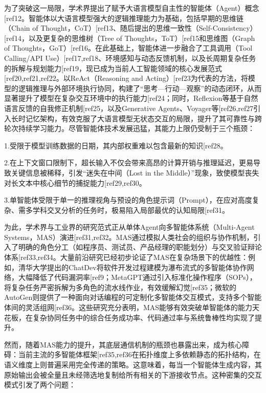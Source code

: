 \documentclass[11pt, a4paper]{article}
\makeatletter
\let\oldcite\cite
\renewcommand{\cite}{\@ifnextchar[{\cite@with}{\cite@without}}
\newcommand{\cite@with}[2][]{\textsuperscript{\oldcite[#1]{#2}}}
\newcommand{\cite@without}[1]{\textsuperscript{\oldcite{#1}}}
\numberwithin{figure}{section}
\makeatother
\begin{document}
为了突破这一局限，学术界提出了赋予大语言模型自主性的智能体（Agent）概念\cite{ref12}。智能体以大语言模型强大的逻辑推理能力为基础，包括早期的思维链（Chain of Thought，CoT）\cite{ref13}、随后提出的思维一致性（Self-Consistency）\cite{ref14}，以及更复杂的思维树（Tree of Thoughts，ToT）\cite{ref15}和思维图（Graph of Thoughts，GoT）\cite{ref16}。在此基础上，智能体进一步融合了工具调用（Tool Calling/API Use）\cite{ref17,ref18}、环境感知与动态反馈机制，以及长周期复杂任务的拆解与规划能力\cite{ref19}，现已成为当前人工智能领域的核心发展范式\cite{ref20,ref21,ref22}。以ReAct（Reasoning and Acting）\cite{ref23}为代表的方法，将模型的逻辑推理与外部环境执行协同，构建了“思考—行动—观察”的动态闭环，从而显著提升了模型在复杂交互环境中的执行能力\cite{ref24}；同时，Reflexion等基于自然语言反馈的自我修正机制\cite{ref25}，以及Generative Agents、Voyager等\cite{ref26,ref27}引入长时记忆架构，有效克服了大语言模型无状态交互的局限，提升了其可靠性与跨轮次持续学习能力。尽管智能体技术发展迅猛，其能力上限仍受制于三个瓶颈：


\par 1.受限于模型训练数据的日期，其内部权重难以包含最新的知识\cite{ref28}。

\par 2.在上下文窗口限制下，超长输入不仅会带来高昂的计算开销与推理延迟，更易导致关键信息被稀释，引发“迷失在中间（Lost in the Middle）”现象，致使模型丧失对长文本中核心细节的捕捉能力\cite{ref29,ref30}。

\par 3.单智能体受限于单一的推理视角与预设的角色提示词（Prompt），在应对高度复杂、需多学科交叉分析的任务时，极易陷入局部最优的认知局限\cite{ref31}。

为此，学术界与工业界的研究范式正从单体Agent向多智能体系统（Multi-Agent Systems，MAS）演进\cite{ref31,ref32}。MAS通过模拟人类社会的组织与协作机制，引入了明确的角色分工（如程序员、测试员、产品经理的职能划分）与交叉验证辩论体系\cite{ref33,ref34}。大量前沿研究已经初步论证了MAS在复杂场景下的优越性：例如，清华大学提出的ChatDev将软件开发过程建模为瀑布流式的多智能体协作网络，大幅降低了代码漏洞率\cite{ref9}；MetaGPT通过引入标准化操作程序（SOPs），将复杂任务严密拆解为多角色的流水线作业，有效缓解幻觉\cite{ref35}；微软的AutoGen则提供了一种面向对话编程的可定制化多智能体交互模式，支持多个智能体间的灵活组网\cite{ref36}。这些研究充分表明，MAS能够有效突破单智能体的能力天花板，在复杂协同任务中的综合任务成功率、代码通过率与系统鲁棒性均实现了提升。

然而，随着MAS能力的提升，其底层通信机制的瓶颈也暴露出来，成为核心障碍：当前主流的多智能体框架\cite{ref35,ref36}在拓扑维度上多依赖静态的拓扑结构，在语义维度上则普遍采用完全传递的策略。这意味着，每当一个智能体生成内容，其原始输出会被全量且未经筛选地复制给所有相关的下游接收节点。这种密集的交互模式引发了两个问题：
\end{document}
